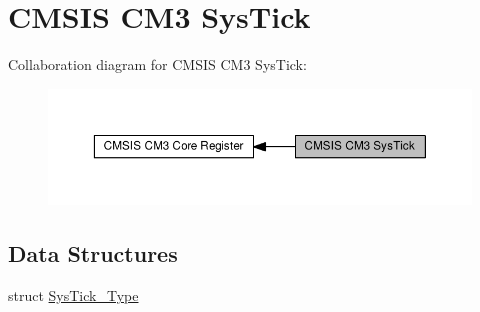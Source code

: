 \hypertarget{group__CMSIS__CM3__SysTick}{}\section{C\+M\+S\+IS C\+M3 Sys\+Tick}
\label{group__CMSIS__CM3__SysTick}
Collaboration diagram for C\+M\+S\+IS C\+M3 Sys\+Tick\+:\nopagebreak
\begin{figure}[H]
\begin{center}
\leavevmode
\includegraphics[width=350pt]{d3/db0/group__CMSIS__CM3__SysTick}
\end{center}
\end{figure}
\subsection*{Data Structures}
\begin{DoxyCompactItemize}
\item 
struct \hyperlink{structSysTick__Type}{Sys\+Tick\+\_\+\+Type}
\end{DoxyCompactItemize}
